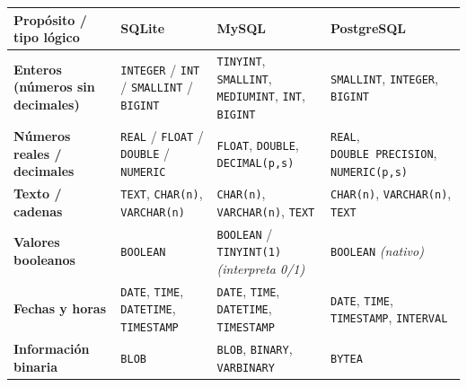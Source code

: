 \documentclass[
]{book}
\newcounter{none} %
\theoremstyle{break}
\theoremstyle{nonumberplain}
\begin{document}
{\def\LTcaptype{none} %
\begin{longtable}[]{@{}
  >{\raggedright\arraybackslash}p{}
  >{\raggedright\arraybackslash}p{}
  >{\raggedright\arraybackslash}p{}
  >{\raggedright\arraybackslash}p{}@{}}
\toprule\noalign{}
\begin{minipage}[b]{\linewidth}\raggedright
Propósito / tipo lógico
\end{minipage} & \begin{minipage}[b]{\linewidth}\raggedright
\textbf{SQLite}
\end{minipage} & \begin{minipage}[b]{\linewidth}\raggedright
\textbf{MySQL}
\end{minipage} & \begin{minipage}[b]{\linewidth}\raggedright
\textbf{PostgreSQL}
\end{minipage} \\
\midrule\noalign{}
\endhead
\bottomrule\noalign{}
\endlastfoot
\textbf{Enteros (números sin decimales)} & \texttt{INTEGER} / \texttt{INT} / \texttt{SMALLINT} / \texttt{BIGINT} & \texttt{TINYINT}, \texttt{SMALLINT}, \texttt{MEDIUMINT}, \texttt{INT}, \texttt{BIGINT} & \texttt{SMALLINT}, \texttt{INTEGER}, \texttt{BIGINT} \\
\textbf{Números reales / decimales} & \texttt{REAL} / \texttt{FLOAT} / \texttt{DOUBLE} / \texttt{NUMERIC} & \texttt{FLOAT}, \texttt{DOUBLE}, \texttt{DECIMAL(p,s)} & \texttt{REAL}, \texttt{DOUBLE\ PRECISION}, \texttt{NUMERIC(p,s)} \\
\textbf{Texto / cadenas} & \texttt{TEXT}, \texttt{CHAR(n)}, \texttt{VARCHAR(n)} & \texttt{CHAR(n)}, \texttt{VARCHAR(n)}, \texttt{TEXT} & \texttt{CHAR(n)}, \texttt{VARCHAR(n)}, \texttt{TEXT} \\
\textbf{Valores booleanos} & \texttt{BOOLEAN} & \texttt{BOOLEAN} / \texttt{TINYINT(1)} \emph{(interpreta 0/1)} & \texttt{BOOLEAN} \emph{(nativo)} \\
\textbf{Fechas y horas} & \texttt{DATE}, \texttt{TIME}, \texttt{DATETIME}, \texttt{TIMESTAMP} & \texttt{DATE}, \texttt{TIME}, \texttt{DATETIME}, \texttt{TIMESTAMP} & \texttt{DATE}, \texttt{TIME}, \texttt{TIMESTAMP}, \texttt{INTERVAL} \\
\textbf{Información binaria} & \texttt{BLOB} & \texttt{BLOB}, \texttt{BINARY}, \texttt{VARBINARY} & \texttt{BYTEA} \\
\end{longtable}
}
\end{document}
